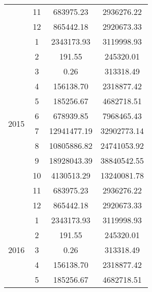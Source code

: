 \documentclass[12pt,letterpaper]{article}
\begin{document}
\begin{table}[H]
\begin{tabular}{l|c|c|c}
 & 11 & 683975.23 & 2936276.22 \\
 & 12 & 865442.18 & 2920673.33 \\
\cline{1-4}
\multirow[t]{12}{*}{2015} & 1 & 2343173.93 & 3119998.93 \\
 & 2 & 191.55 & 245320.01 \\
 & 3 & 0.26 & 313318.49 \\
 & 4 & 156138.70 & 2318877.42 \\
 & 5 & 185256.67 & 4682718.51 \\
 & 6 & 678939.85 & 7968465.43 \\
 & 7 & 12941477.19 & 32902773.14 \\
 & 8 & 10805886.82 & 24741053.92 \\
 & 9 & 18928043.39 & 38840542.55 \\
 & 10 & 4130513.29 & 13240081.78 \\
 & 11 & 683975.23 & 2936276.22 \\
 & 12 & 865442.18 & 2920673.33 \\
\cline{1-4}
\multirow[t]{12}{*}{2016} & 1 & 2343173.93 & 3119998.93 \\
 & 2 & 191.55 & 245320.01 \\
 & 3 & 0.26 & 313318.49 \\
 & 4 & 156138.70 & 2318877.42 \\
 & 5 & 185256.67 & 4682718.51 \\
\cline{1-4}
\hline
\end{tabular}
\end{table}
\end{document}
